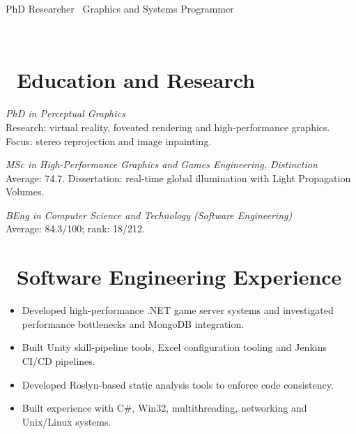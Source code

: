 \documentclass{resume}
\begin{document}
\centerline{PhD Researcher \textperiodcentered\ Graphics and Systems Programmer}
\centerline{ \textperiodcentered\ }

\section{\faGraduationCap\ Education and Research}
\textit{PhD in Perceptual Graphics}\\
Research: virtual reality, foveated rendering and high-performance graphics.\\
Focus: stereo reprojection and image inpainting.

\textit{MSc in High-Performance Graphics and Games Engineering, Distinction}\\
Average: 74.7. Dissertation: real-time global illumination with Light Propagation Volumes.

\textit{BEng in Computer Science and Technology (Software Engineering)}\\
Average: 84.3/100; rank: 18/212.

\section{\faUsers\ Software Engineering Experience}
\begin{itemize}
  \item Developed high-performance .NET game server systems and investigated performance bottlenecks and MongoDB integration.
  \item Built Unity skill-pipeline tools, Excel configuration tooling and Jenkins CI/CD pipelines.
  \item Developed Roslyn-based static analysis tools to enforce code consistency.
\end{itemize}
\begin{itemize}
  \item Built experience with C\#, Win32, multithreading, networking and Unix/Linux systems.
\end{itemize}
\end{document}
